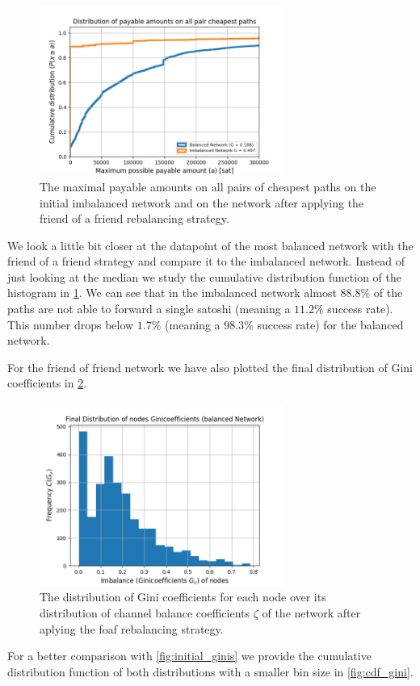\documentclass[a4paper]{paper}
\begin{document}
\begin{figure}
 \centering
 \includegraphics[width=8cm]{code/vs/fig/maximum_payable_amount_all_pair_chepest_paths_balanced_network.png}
 \caption{The maximal payable amounts on all pairs of cheapest paths on the initial imbalanced network and on the network after applying the friend of a friend rebalancing strategy.}
 \label{fig:cdf_paymentsize}
\end{figure}
We look a little bit closer at the datapoint of the most balanced network with the friend of a friend strategy and compare it to the imbalanced network.
Instead of just looking at the median we study the cumulative distribution function of the histogram in \cref{fig:cdf_paymentsize}.
We can see that in the imbalanced network almost $88.8\%$ of the paths are not able to forward a single satoshi (meaning a $11.2\%$ success rate).
This number drops below $1.7\%$ (meaning a $98.3\%$ success rate) for the balanced network.

For the friend of friend network we have also plotted the final distribution of Gini coefficients in \cref{fig:final_gini}. 
\begin{figure}
 \centering
 \includegraphics[width=8cm]{code/vs/fig/Final_ginis_after_rebalancing.png}
 \caption{The distribution of Gini coefficients for each node over its distribution of channel balance coefficients $\zeta$ of the network after aplying the foaf rebalancing strategy.}
 \label{fig:final_gini}
\end{figure}
For a better comparison with \cref{fig:initial_ginis} we provide the cumulative distribution function of both distributions with a smaller bin size in \cref{fig:cdf_gini}.
\end{document}
